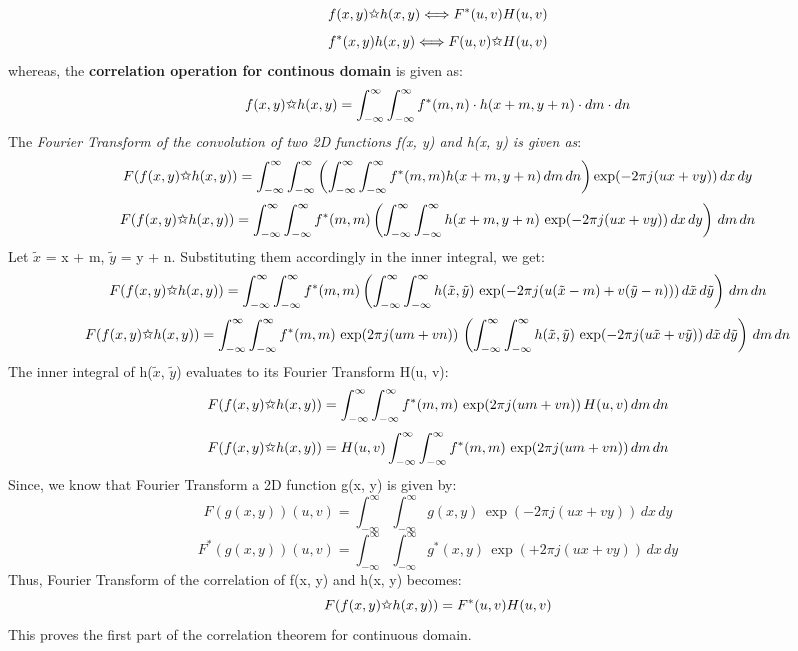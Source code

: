 \documentclass{article}
\begin{document}
\begin{enumerate}
\[
f(x, y) \text{\ding{73}} h(x, y) \Longleftrightarrow F^*(u, v) H(u, v)
\]
\[
f^*(x, y) h(x, y) \Longleftrightarrow F(u, v) \text{\ding{73}} H(u, v)
\]
whereas, the \textbf{correlation operation for continous domain} is given as:
\[
f(x, y) \text{\ding{73}} h(x, y) = \int_{-\infty}^{\infty} \int_{-\infty}^{\infty} f^*(m, n) \cdot h(x + m, y + n) \cdot dm \cdot dn
\]
The \textit{Fourier Transform of the convolution of two 2D functions f(x, y) and h(x, y) is given as}:
\[
   F(f(x, y) \text{\ding{73}} h(x, y)) = \int_{-\infty}^{\infty} \int_{-\infty}^{\infty} \left( \int_{-\infty}^{\infty} \int_{-\infty}^{\infty} f^*(m, m) h(x + m, y + n) \, dm \, dn \right) \exp(-2 \pi j (ux + vy)) \, dx \, dy
\]
\[
   F(f(x, y) \text{\ding{73}} h(x, y)) = \int_{-\infty}^{\infty} \int_{-\infty}^{\infty} f^*(m, m) \left( \int_{-\infty}^{\infty} \int_{-\infty}^{\infty} h(x + m, y + n) \, \exp(-2 \pi j (ux + vy)) \, dx \, dy \right) \, dm \, dn
\]
Let $\tilde{x}$ = x + m, $\tilde{y}$ = y + n. Substituting them accordingly in the inner integral, we get:
\[
   F(f(x, y) \text{\ding{73}} h(x, y)) = \int_{-\infty}^{\infty} \int_{-\infty}^{\infty} f^*(m, m) \left( \int_{-\infty}^{\infty} \int_{-\infty}^{\infty} h(\tilde{x}, \tilde{y}) \, \exp(-2 \pi j (u(\tilde{x} - m) + v(\tilde{y} - n))) \, d\tilde{x} \, d\tilde{y} \right) \, dm \, dn
\]
\[
   F(f(x, y) \text{\ding{73}} h(x, y)) = \int_{-\infty}^{\infty} \int_{-\infty}^{\infty} f^*(m, m) \, \exp(2 \pi j (um + vn)) \, \left( \int_{-\infty}^{\infty} \int_{-\infty}^{\infty} h(\tilde{x}, \tilde{y}) \, \exp(-2 \pi j (u\tilde{x} + v\tilde{y})) \, d\tilde{x} \, d\tilde{y} \right) \, dm \, dn
\]
The inner integral of h($\tilde{x}$, $\tilde{y}$) evaluates to its Fourier Transform H(u, v):
\[
   F(f(x, y) \text{\ding{73}} h(x, y)) = \int_{-\infty}^{\infty} \int_{-\infty}^{\infty} f^*(m, m) \, \exp(2 \pi j (um + vn)) \, H(u, v) \, dm \, dn
\]
\[
   F(f(x, y) \text{\ding{73}} h(x, y)) = H(u, v) \int_{-\infty}^{\infty} \int_{-\infty}^{\infty} f^*(m, m) \, \exp(2 \pi j (um + vn)) \, dm \, dn
\]
Since, we know that Fourier Transform a 2D function g(x, y) is given by:
\[
   F(g(x, y))(u, v) = \int_{-\infty}^{\infty} \int_{-\infty}^{\infty} g(x, y) \, \exp(-2 \pi j (ux + vy)) \, dx \, dy
\]
\[
   F^*(g(x, y))(u, v) = \int_{-\infty}^{\infty} \int_{-\infty}^{\infty} g^*(x, y) \, \exp(+2 \pi j (ux + vy)) \, dx \, dy
\]
Thus, Fourier Transform of the correlation of f(x, y) and h(x, y) becomes: 
\[
   F(f(x, y) \text{\ding{73}} h(x, y)) = F^*(u, v) H(u, v)
\]
This proves the first part of the correlation theorem for continuous domain.


\end{enumerate}
\end{document}
